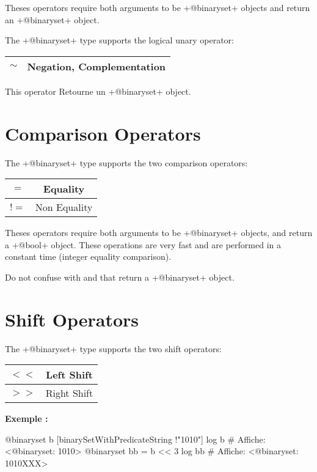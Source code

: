 Theses operators require both arguments to be \ggs+@binaryset+ objects and return an \ggs+@binaryset+ object.\newline


The \ggs+@binaryset+ type supports the logical unary operator:\newline

\begin{tabular}{|c|c|}
\hline
$\sim$ & Negation, Complementation \\
\hline
\end{tabular}

This operator Retourne un \ggs+@binaryset+ object.







\section{Comparison Operators}

The \ggs+@binaryset+ type supports the two comparison operators:\newline

\begin{tabular}{|c|c|}
\hline
$=$ & Equality \\
\hline
$!=$ & Non Equality \\
\hline
\end{tabular}

Theses operators require both arguments to be \ggs+@binaryset+ objects, and return a \ggs+@bool+ object. These operations are very fast and are performed in a constant time (integer equality comparison).

Do not confuse with  and  that return a \ggs+@binaryset+ object.







\section{Shift Operators}

The \ggs+@binaryset+ type supports the two shift operators:\newline

\begin{tabular}{|c|c|}
\hline
$<<$ & Left Shift \\
\hline
$>>$ & Right Shift \\
\hline
\end{tabular}

\textbf{Exemple :}
\begin{galgas}
@binaryset b [binarySetWithPredicateString !"1010"]
log b # Affiche: <@binaryset: 1010>
@binaryset bb = b << 3
log bb # Affiche: <@binaryset: 1010XXX>
\end{galgas}

